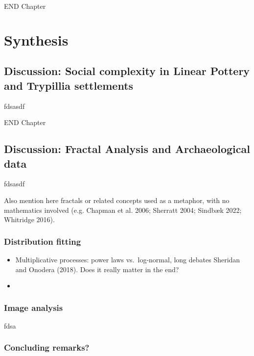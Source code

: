 \documentclass[
  12pt,
]{book}
\begin{document}
END Chapter

\hypertarget{part-synthesis}{%
\part{Synthesis}\label{part-synthesis}}

\hypertarget{disc-results}{%
\chapter{Discussion: Social complexity in Linear Pottery and Trypillia settlements}\label{disc-results}}

fdsasdf

END Chapter

\hypertarget{disc-methods}{%
\chapter{Discussion: Fractal Analysis and Archaeological data}\label{disc-methods}}

fdsasdf

Also mention here fractals or related concepts used as a metaphor, with no mathematics involved (e.g. Chapman et al. 2006; Sherratt 2004; Sindbæk 2022; Whitridge 2016).

\hypertarget{distribution-fitting}{%
\section{Distribution fitting}\label{distribution-fitting}}

\begin{itemize}
\item
  Multiplicative processes: power laws vs.~log-normal, long debates Sheridan and Onodera (2018). Does it really matter in the end?
\item
\end{itemize}

\hypertarget{image-analysis}{%
\section{Image analysis}\label{image-analysis}}

fdsa

\hypertarget{concluding-remarks}{%
\section{Concluding remarks?}\label{concluding-remarks}}
\end{document}
